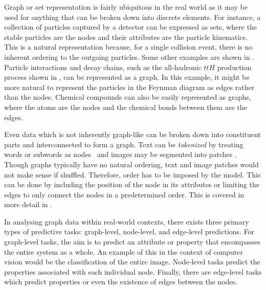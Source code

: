 Graph or set representation is fairly ubiquitous in the real world as it may be used for anything that can be broken down into discrete elements.
For instance, a collection of particles captured by a detector can be expressed as sets, where the stable particles are the nodes and their attributes are the particle kinematics.
This is a natural representation because, for a single collision event, there is no inherent ordering to the outgoing particles.
Some other examples are shown in .
Particle interactions and decay chains, such as the all-hadronic $ttH$ production process shown in , can be represented as a graph.
In this example, it might be more natural to represent the particles in the Feynman diagram as edges rather than the nodes.
Chemical compounds can also be easily represented as graphs, where the atoms are the nodes and the chemical bonds between them are the edges.

Even data which is not inherently graph-like can be broken down into constituent parts and interconnected to form a graph.
Text can be \textit{tokenized} by treating words or subwords as nodes~\cite{Attention} and images may be segmented into patches .
Though graphs typically have no natural ordering, text and image patches would not make sense if shuffled.
Therefore, order has to be imposed by the model.
This can be done by including the position of the node in its attributes or limiting the edges to only connect the nodes in a predetermined order.
This is covered in more detail in .

In analysing graph data within real-world contexts, there exists three primary types of predictive tasks: graph-level, node-level, and edge-level predictions.
For graph-level tasks, the aim is to predict an attribute or property that encompasses the entire system as a whole.
An example of this in the context of computer vision would be the classification of the entire image.
Node-level tasks predict the properties associated with each individual node.
Finally, there are edge-level tasks which predict properties or even the existence of edges between the nodes.

